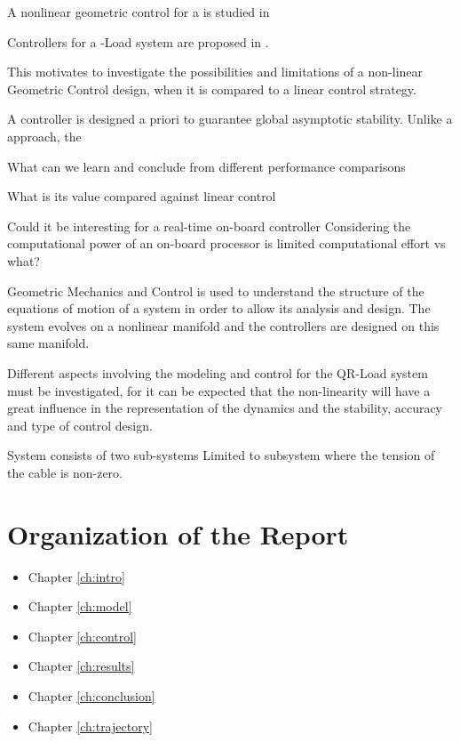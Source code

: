 A nonlinear geometric  control for a  is studied in \cite{Goodarzi2013a}

Controllers for a -Load system are proposed in \cite{Sreenath2013b,Tang2015}.


This motivates to investigate the possibilities and limitations of a non-linear Geometric Control design, when it is compared to a linear control strategy.

A controller is designed a priori to guarantee global asymptotic stability. 
Unlike a  approach, the 

What can we learn and conclude from different performance comparisons

What is its value compared against linear control

Could it be interesting for a real-time on-board controller
Considering the computational power of an on-board processor is limited
computational effort vs what?

Geometric Mechanics and Control is used to understand the structure of the equations of motion of a system in order to allow its analysis and design. The system evolves on a nonlinear manifold and the controllers are designed on this same manifold.

Different aspects involving the modeling and control for the QR-Load system must be investigated, for it can be expected that the non-linearity will have a great influence in the representation of the dynamics and the stability, accuracy and type of control design.

System consists of two sub-systems
Limited to subsystem where the tension of the cable is non-zero. 

\section{Organization of the Report}

\begin{itemize}
\item Chapter \ref{ch:intro}
\item Chapter \ref{ch:model}
\item Chapter \ref{ch:control}
\item Chapter \ref{ch:results}
\item Chapter \ref{ch:conclusion}
\item Chapter \ref{ch:trajectory}
\end{itemize}
